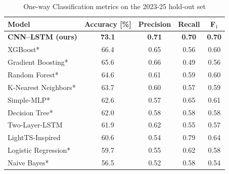 \documentclass[conference]{IEEEtran}
\begin{document}



\begin{table}[htbp]
\caption{One-way Classification metrics on the 2023-25 hold-out set}
\centering
\begin{tabular}{l c c c c}
\toprule
\textbf{Model} & \textbf{Accuracy [\%]} & \textbf{Precision} & \textbf{Recall} & \textbf{F$_1$} \\
\midrule
\rowcolor{gray!20}
\textbf{CNN–LSTM (ours)} & \textbf{73.1} & \textbf{0.71} & \textbf{0.70} & \textbf{0.70} \\
XGBoost* & 66.4 & 0.65 & 0.56 & 0.60 \\
Gradient Boosting* & 65.6 & 0.66 & 0.49 & 0.56 \\
Random Forest* & 64.6 & 0.61 & 0.59 & 0.60 \\
K-Nearest Neighbors* & 63.7 & 0.60 & 0.57 & 0.59 \\
Simple-MLP* & 62.6 & 0.57 & 0.65 & 0.61 \\
Decision Tree* & 62.0 & 0.58 & 0.58 & 0.58 \\
Two-Layer-LSTM & 61.9 & 0.62 & 0.55 & 0.57 \\
LightTS-Inspired & 60.6 & 0.54 & 0.79 & 0.64 \\
Logistic Regression* & 59.7 & 0.55 & 0.62 & 0.58 \\
Naive Bayes* & 56.5 & 0.52 & 0.58 & 0.54 \\
\bottomrule
\end{tabular}
\vspace{-6pt}
\label{tab:cls_metrics}
\end{table}
\end{document}
